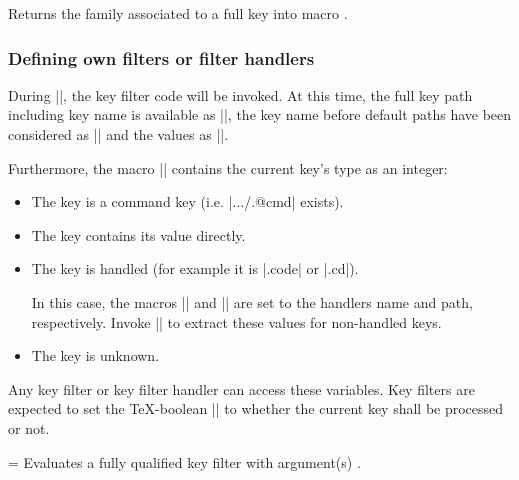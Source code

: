 \begin{command}{\pgfkeysgetfamily{}}%
	Returns the family associated to a full key  into macro .
\end{command}

\subsubsection{Defining own filters or filter handlers}
\label{section-key-writing-filters}
	During |\pgfkeysfiltered|, the key filter code will be invoked. At this time, the full key path including key name is available as |\pgfkeyscurrentkey|, the key name before default paths have been considered as |\pgfkeyscurrentkeyRAW| and the values as |\pgfkeyscurrentvalue|. 

	Furthermore, the macro |\pgfkeyscasenumber| contains the current key's type as an integer:
\begin{itemize}
\item[\meta{1}] The key is a command key (i.e. |.../.@cmd| exists).
\item[\meta{2}] The key contains its value directly.
\item[\meta{3}] The key is handled (for example it is |.code| or |.cd|).

In this case, the macros |\pgfkeyscurrentname| and |\pgfkeyscurrentpath| are set to the handlers name and path, respectively.
Invoke |\pgfkeyssplitpath{}| to extract these values for non-handled keys. 
\item[\meta{0}] The key is unknown.
\end{itemize}
	Any key filter or key filter handler can access these variables. Key filters are expected to set the \TeX-boolean |\ifpgfkeysfiltercontinue| to whether the current key shall be processed or not.

\begin{command}{\pgfkeysevalkeyfilterwith{}=}
	Evaluates a fully qualified key filter  with argument(s) .
\begin{codeexample}
\end{codeexample}
\end{command}
\endgroup

